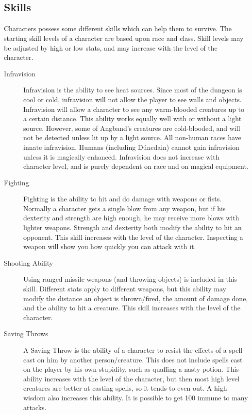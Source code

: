 \subsection{Skills}
\paragraph{}
Characters possess some different skills which can help them to survive.
The starting skill levels of a character are based upon race and class.
Skill levels may be adjusted by high or low stats, and may increase with
the level of the character.

\begin{description}
\item[Infravision]
  Infravision is the ability to see heat sources. Since most
  of the dungeon is cool or cold, infravision will not allow
  the player to see walls and objects. Infravision will allow
  a character to see any warm-blooded creatures up to a certain
  distance. This ability works equally well with or without a light
  source. However, some of Angband's creatures are 
  cold-blooded, and will not be detected unless lit up by a
  light source. All non-human races have innate infravision.
  Humans (including D\'{u}nedain) cannot gain infravision unless it
  is magically enhanced. Infravision does not increase with
  character level, and is purely dependent on race and on
  magical equipment.
 
\item[Fighting]
  Fighting is the ability to hit and do damage with weapons or
  fists. Normally a character gets a single blow from any
  weapon, but if his dexterity and strength are high enough,
  he may receive more blows with lighter weapons. Strength and
  dexterity both modify the ability to hit an opponent. This
  skill increases with the level of the character. Inspecting a
  weapon will show you how quickly you can attack with it.
 
\item[Shooting Ability]
  Using ranged missile weapons (and throwing objects) is
  included in this skill. Different stats apply to different
  weapons, but this ability may modify the distance an object
  is thrown/fired, the amount of damage done, and the ability
  to hit a creature. This skill increases with the level of
  the character.
 
\item[Saving Throws]
  A Saving Throw is the ability of a character to resist the
  effects of a spell cast on him by another person/creature.
  This does not include spells cast on the player by his own
  stupidity, such as quaffing a nasty potion. This ability
  increases with the level of the character, but then most
  high level creatures are better at casting spells, so it
  tends to even out. A high wisdom also increases this ability.
  It is possible to get 100%
  immune to many attacks.
 

\end{description}
